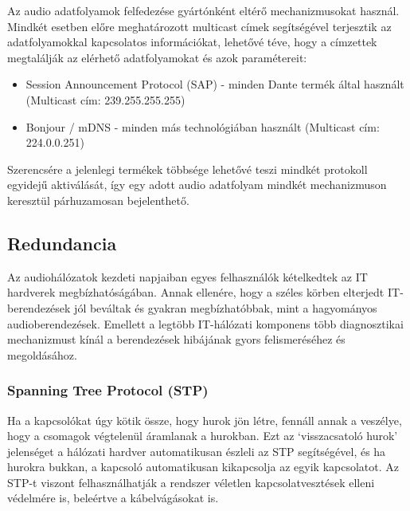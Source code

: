 Az audio adatfolyamok felfedezése gyártónként eltérő mechanizmusokat használ. Mindkét esetben 
előre meghatározott multicast címek segítségével terjesztik az adatfolyamokkal kapcsolatos 
információkat, lehetővé téve, hogy a címzettek megtalálják az elérhető adatfolyamokat és azok paramétereit:







\begin{itemize}
	\item Session Announcement Protocol (SAP) - minden Dante termék által használt (Multicast cím: 239.255.255.255)
\end{itemize}

\begin{itemize}
	\item Bonjour / mDNS - minden más technológiában használt (Multicast cím: 224.0.0.251) 
\end{itemize}
Szerencsére a jelenlegi termékek többsége
lehetővé teszi mindkét protokoll egyidejű aktiválását, így egy adott audio
adatfolyam mindkét mechanizmuson keresztül párhuzamosan bejelenthető.

\subsection{Redundancia}
Az audiohálózatok kezdeti napjaiban egyes felhasználók kételkedtek az IT
hardverek megbízhatóságában. Annak ellenére, hogy a széles körben elterjedt
IT-berendezések jól beváltak és gyakran megbízhatóbbak, mint a hagyományos
audioberendezések. Emellett a legtöbb IT-hálózati komponens több diagnosztikai
mechanizmust kínál a berendezések hibájának gyors felismeréséhez és megoldásához.

\subsubsection{Spanning Tree Protocol (STP)}
Ha a kapcsolókat úgy kötik össze, hogy hurok jön létre, fennáll annak a veszélye, 
hogy a csomagok végtelenül áramlanak a hurokban. 
Ezt az `visszacsatoló hurok' jelenséget a hálózati hardver automatikusan észleli az
STP segítségével, és ha hurokra bukkan, a kapcsoló automatikusan kikapcsolja az egyik
kapcsolatot. Az STP-t viszont felhasználhatják a rendszer véletlen
kapcsolatvesztések elleni védelmére is, beleértve a kábelvágásokat is. 

